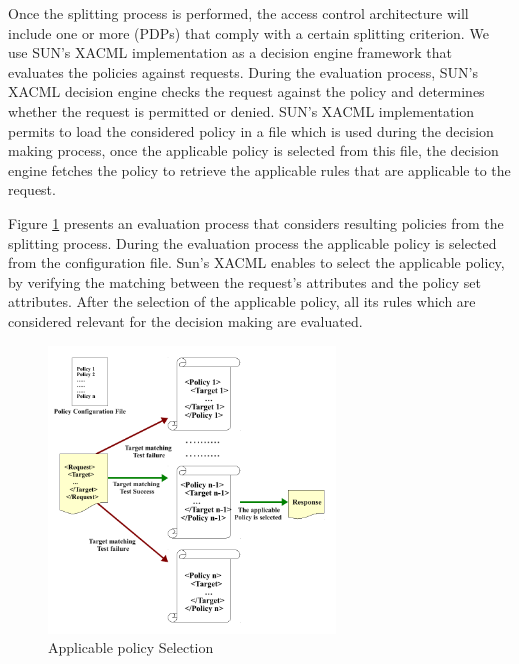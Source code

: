Once the splitting process is performed, the access control architecture will include one or more (PDPs) that comply with a certain splitting criterion.
We use SUN's XACML implementation \cite{sunxacml} as a decision engine framework that evaluates the policies against requests.
During the evaluation process, SUN's XACML decision engine checks the request against the policy and determines whether the request is 
permitted or denied. SUN's XACML implementation permits to load the considered policy in a file which is used during the decision making process, once the applicable policy 
is selected from this file, the decision engine fetches the policy to retrieve the applicable rules that are applicable to the request.


Figure \ref{requestevaluation} presents an evaluation process that considers resulting policies from the splitting process. 
During the evaluation process the applicable 
policy is selected from the configuration file. Sun's XACML enables to select the applicable policy, by verifying the matching between the request's attributes
 and the policy set attributes. 
After the selection of the applicable policy, all its rules which are considered relevant for the decision making are evaluated.

\begin{figure}[!h]
\begin{center}
\includegraphics[width=3in, height=3in]{requestevaluation}
\caption{Applicable policy Selection}
\label{requestevaluation}
\end{center}
\end{figure}

